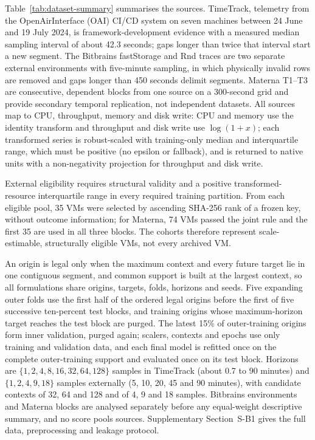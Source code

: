 \documentclass[5p,twocolumn]{elsarticle}
\begin{document}
Table~\ref{tab:dataset-summary} summarises the sources. TimeTrack, telemetry
from the OpenAirInterface (OAI) CI/CD system on seven machines between
24 June and 19 July 2024, is framework-development evidence with a measured
median sampling interval of about 42.3 seconds; gaps longer than twice that
interval start a new segment. The Bitbrains fastStorage and Rnd traces are two separate
external environments with five-minute sampling, in which physically invalid
rows are removed and gaps longer than 450 seconds delimit segments. Materna
T1--T3 are consecutive, dependent blocks from one source on a 300-second grid
and provide secondary temporal replication, not independent datasets. All
sources map to CPU, throughput, memory and disk write: CPU and memory use the
identity transform and throughput and disk write use $\log(1+x)$; each
transformed series is robust-scaled with training-only median and
interquartile range, which must be positive (no epsilon or fallback), and is
returned to native units with a non-negativity projection for throughput and
disk write.

External eligibility requires structural validity and a positive
transformed-resource interquartile range in every required training
partition. From each eligible pool, 35 VMs were selected by ascending SHA-256
rank of a frozen key, without outcome information; for Materna, 74 VMs passed
the joint rule and the first 35 are used in all three blocks. The cohorts
therefore represent scale-estimable, structurally eligible VMs, not every
archived VM.

An origin is legal only when the maximum context and every future target lie
in one contiguous segment, and common support is built at the largest
context, so all formulations share origins, targets, folds, horizons and
seeds. Five expanding outer folds use the first half of the ordered legal
origins before the first of five successive ten-percent test blocks, and
training origins whose maximum-horizon target reaches the test block are
purged. The latest 15\% of outer-training origins form inner validation,
purged again; scalers, contexts and epochs use only training and validation
data, and each final model is refitted once on the complete outer-training
support and evaluated once on its test block. Horizons are
$\{1,2,4,8,16,32,64,128\}$ samples in TimeTrack (about 0.7 to 90
minutes) and $\{1,2,4,9,18\}$ samples externally (5, 10, 20, 45 and 90
minutes), with candidate contexts of 32, 64 and 128 and of 4, 9 and 18
samples. Bitbrains environments and Materna blocks are analysed separately
before any equal-weight descriptive summary, and no score pools sources.
Supplementary Section~S-B1 gives the full data, preprocessing and leakage
protocol.
\end{document}
